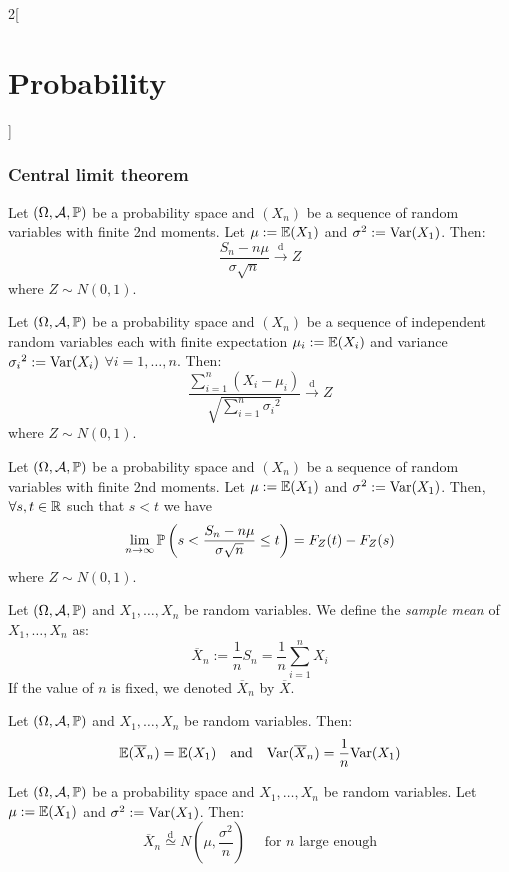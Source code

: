\documentclass[../../../main_math.tex]{subfiles}
\begin{document}
\begin{multicols}{2}[\section{Probability}]
  \subsubsection{Central limit theorem}
  \begin{theorem}
    Let $(\Omega,\mathcal{A},\mathbb{P})$ be a probability space and $(X_n)$ be a sequence of \iid random variables with finite 2nd moments. Let $\mu:=\mathbb{E}(X_1)$ and $\sigma^2:=\mathrm{Var}(X_1)$. Then: $$\frac{S_n-n\mu}{\sigma\sqrt{n}}\overset{\text{d}}{\longrightarrow} Z$$
    where $Z\sim N(0,1)$.
  \end{theorem}
  \begin{theorem}
    Let $(\Omega,\mathcal{A},\mathbb{P})$ be a probability space and $(X_n)$ be a sequence of independent random variables each with finite expectation $\mu_i:=\mathbb{E}(X_i)$ and variance ${\sigma_i}^2:=\mathrm{Var}(X_i)$ $\forall i=1,\ldots,n$. Then: $$\frac{\sum_{i=1}^n(X_i-\mu_i)}{\sqrt{\sum_{i=1}^n{\sigma_i}^2}}\overset{\text{d}}{\longrightarrow} Z$$
    where $Z\sim N(0,1)$.
  \end{theorem}
  \begin{corollary}
    Let $(\Omega,\mathcal{A},\mathbb{P})$ be a probability space and $(X_n)$ be a sequence of \iid random variables with finite 2nd moments. Let $\mu:=\mathbb{E}(X_1)$ and $\sigma^2:=\mathrm{Var}(X_1)$. Then, $\forall s,t\in\mathbb{R}$ such that $s<t$ we have $$\lim_{n\to\infty}\mathbb{P}\left(s<\frac{S_n-n\mu}{\sigma\sqrt{n}}\leq t\right)=F_Z(t)-F_Z(s)$$ where $Z\sim N(0,1)$.
  \end{corollary}
  \begin{definition}
    Let $(\Omega,\mathcal{A},\mathbb{P})$ and $X_1,\ldots,X_n$ be random variables. We define the \emph{sample mean} of $X_1,\ldots,X_n$ as: $$\overline{X}_n:=\frac{1}{n}S_n=\frac{1}{n}\sum_{i=1}^nX_i$$
    If the value of $n$ is fixed, we denoted $\overline{X}_n$ by $\overline{X}$.
  \end{definition}
  \begin{proposition}
    Let $(\Omega,\mathcal{A},\mathbb{P})$ and $X_1,\ldots,X_n$ be \iid random variables. Then: $$\mathbb{E}(\overline{X}_n)=\mathbb{E}(X_1)\quad\text{and}\quad\mathrm{Var}(\overline{X}_n)=\frac{1}{n}\mathrm{Var}(X_1)$$
  \end{proposition}
  \begin{corollary}
    Let $(\Omega,\mathcal{A},\mathbb{P})$ be a probability space and $X_1,\ldots,X_n$ be \iid random variables. Let $\mu:=\mathbb{E}(X_1)$ and $\sigma^2:=\mathrm{Var}(X_1)$. Then: $$\overline{X}_n\overset{\text{d}}{\simeq }N\left(\mu,\frac{\sigma^2}{n}\right)\quad\text{ for $n$ large enough}$$

\end{corollary}
\end{multicols}
\end{document}
